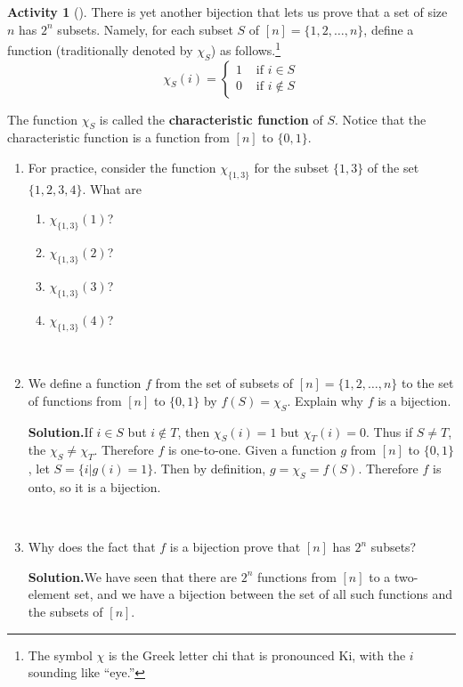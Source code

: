 \documentclass[10pt,]{book}
\newcommand{\terminology}[1]{\textbf{#1}}
\theoremstyle{plain}
\theoremstyle{definition}
\newtheorem{activity}[project]{Activity}
\numberwithin{equation}{chapter}
\newcommand{\amp}{&}
\begin{document}
\begin{activity}[]\label{charfunction}
There is yet another bijection that lets us prove that a set of size \(n\) has \(2^n\) subsets. Namely, for each subset \(S\) of \([n]=\{1,2,\ldots, n\}\), define a function (traditionally denoted by \(\chi_S\)) as follows.\footnote{The symbol \(\chi\) is the Greek letter chi that is pronounced Ki, with the \(i\) sounding like ``eye.''\label{fn-1}}%
\begin{equation*}
\chi_S(i) = \begin{cases}1 \amp \mbox{ if }  i\in S \\ 0 \amp \mbox{ if }  i\not\in
S
\end{cases}
\end{equation*}
%
\par
The function \(\chi_S\) is called the \terminology{characteristic function} of \(S\). Notice that the characteristic function is a function from \([n]\) to \(\{0,1\}\).%
~\par
\begin{enumerate}[label=(\alph*)]
 \item For practice, consider the function \(\chi_{\{1,3\}}\) for the subset \(\{1,3\}\) of the set \(\{1,2,3,4\}\).  What are \leavevmode%
\begin{enumerate}[label=(\roman*)]
\item\hypertarget{li-5}{}\(\chi_{\{1,3\}}(1)\)?%
\item\hypertarget{li-6}{}\(\chi_{\{1,3\}}(2)\)?%
\item\hypertarget{li-7}{}\(\chi_{\{1,3\}}(3)\)?%
\item\hypertarget{li-8}{}\(\chi_{\{1,3\}}(4)\)?%
\end{enumerate}
%

~\par
\item We define a function \(f\) from the set of subsets of \([n]=\{1,2,\ldots, n\}\) to the set of functions from \([n]\) to \(\{0,1\}\) by \(f(S)=\chi_S\).  Explain why \(f\) is a bijection.%
\par\medskip\noindent%
\textbf{Solution.}\quad If \(i\in S\) but \(i\not\in T\), then \(\chi_S(i)=1\) but \(\chi_T(i)=0\). Thus if \(S\not= T\), the \(\chi_S\not=\chi_T\). Therefore \(f\) is one-to-one. Given a function \(g\) from \([n]\) to \(\{0,1\}\), let \(S=\{i|g(i)=1\}\). Then by definition, \(g=\chi_S=f(S)\). Therefore \(f\) is onto, so it is a bijection.%

~\par
\item Why does the fact that \(f\) is a bijection prove that \([n]\) has \(2^n\) subsets?%
\par\medskip\noindent%
\textbf{Solution.}\quad We have seen that there are \(2^n\) functions from \([n]\) to a two-element set, and we have a bijection between the set of all such functions and the subsets of \([n]\).%

\end{enumerate}
\end{activity}
\end{document}
